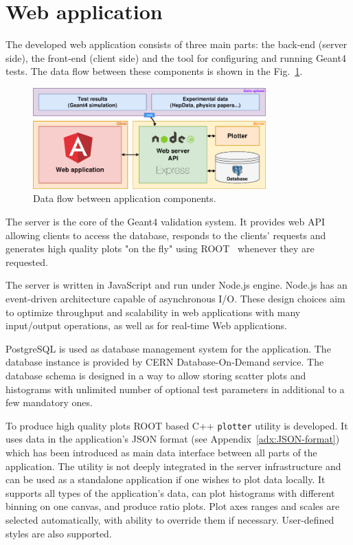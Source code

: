 \section{Web application}
\label{sec-webapplication}

The developed web application consists of three main parts: the back-end (server side), the front-end (client side) and the tool 
for configuring and running Geant4 tests. The data flow between these components is shown in the Fig.~\ref{fig:dataflow}.

\begin{figure}[h]
    \centering
    \includegraphics[width=0.8\textwidth,clip]{schema.png}
    \caption{Data flow between application components.}
    \label{fig:dataflow}
\end{figure}

The server is the core of the Geant4 validation system. It provides web API allowing clients to access the database, responds to the clients' requests and generates high quality plots "on the fly" using ROOT~\cite{ROOT} whenever they are requested.

The server is written in JavaScript and run under Node.js engine. Node.js has an event-driven architecture capable of asynchronous I/O. These design choices aim to optimize throughput and scalability in web applications with many input/output operations, as well as for real-time Web applications.

PostgreSQL is used as database management system for the application. The database instance is provided by CERN Database-On-Demand service. The database schema is designed in a way to allow storing scatter plots and histograms with unlimited number of optional test parameters in additional to a few mandatory ones.

To produce high quality plots ROOT based C++ {\tt plotter} utility is developed. It uses data in the application's JSON format (see Appendix~\ref{adx:JSON-format}) which has been introduced as main data interface between all parts of the application. The utility is not deeply integrated in the server infrastructure and can be used as a standalone application if one wishes to plot data locally. It supports all types of the application's data, can plot histograms with different binning on one canvas, and produce ratio plots. Plot axes ranges and scales are selected automatically, with ability to override them if necessary. User-defined styles are also supported.


